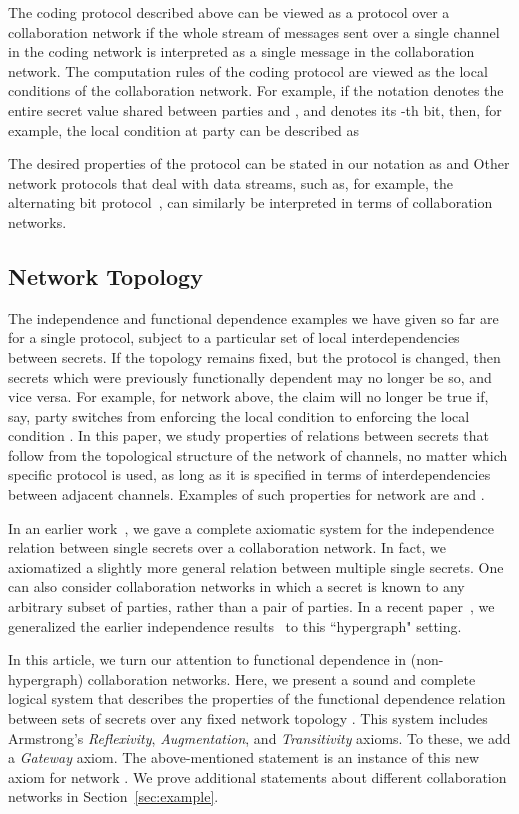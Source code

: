 \documentclass{llncs}
\newcommand{\gateway}{Gateway }
\begin{document}
The coding protocol described above can be viewed as a protocol over a collaboration network if the whole stream of messages sent over a single channel in the coding network is interpreted as a single message in the collaboration network.  The computation rules
of the coding protocol are viewed as the local conditions of the collaboration network. For example, if the notation  denotes the entire secret value shared between parties  and , and  denotes its -th bit, then, for example, the local condition at party  can be described as 
 
The desired properties of the protocol can be stated in our notation as 
 and
 Other network protocols that deal with data streams, such as, for example, the alternating bit protocol~\cite{bsw69}, can similarly be interpreted in terms of collaboration networks.



\subsection{Network Topology}

The independence and functional dependence examples we have given so far are for a single protocol, subject to a particular set of local interdependencies between secrets. If the topology remains fixed, but the protocol is changed, then secrets which were previously functionally dependent may no longer be so, and vice versa. For example, for network  above, the claim  will no longer be true if, say, party  switches from enforcing the local condition  to enforcing the local condition . In this paper, we study properties of relations between secrets that follow from the topological structure of the network of channels, no matter which specific protocol is used, as long as it is specified in terms of interdependencies between adjacent channels. Examples of such properties for network  are  and . 

In an earlier work~\cite{mn09a}, we gave a complete axiomatic system for the independence relation between single secrets over a collaboration network. In fact, we axiomatized a slightly more general relation  between multiple single secrets.  One can also consider collaboration networks in which a secret is known to any arbitrary subset of parties, rather than a pair of parties.  In a recent paper~\cite{mn10clima}, we generalized the earlier independence results~\cite{mn09a} to this ``hypergraph" setting.
 
In this article, we turn our attention to functional dependence in (non-hypergraph) collaboration networks.  Here, we present a sound and complete logical system that describes the properties of the functional dependence relation  between sets of secrets over any fixed network topology .  This system includes Armstrong's {\em Reflexivity}, {\em Augmentation}, and {\em Transitivity} axioms.  To these, we add a {\em \gateway} axiom. The above-mentioned statement  is an instance of this new axiom for network .  We prove additional statements about different collaboration networks in Section~\ref{sec:example}. 
\end{document}
